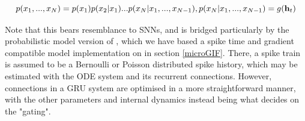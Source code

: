 \documentclass[mphil,deptreport,ianc]{infthesis} %
\begin{document}
\begin{equation}
    p(x_1, ..., x_N) = p(x_1)p(x_2|x_1) ... p(x_N|x_1,...,x_{N-1}), \\
    p(x_N|x_1,...,x_{N-1}) = g(\textbf{h}_t)
\end{equation}

Note that this bears resemblance to SNNs, and is bridged particularly by the probabilistic model version of \cite{Rene2020}, which we have based a spike time and gradient compatible model implementation on in section \ref{microGIF}.
There, a spike train is assumed to be a Bernoulli or Poisson distributed spike history, which may be estimated with the ODE system and its recurrent connections.
However, connections in a GRU \cite{Chung2015a} system are optimised in a more straightforward manner, with the other parameters and internal dynamics instead being what decides on the "gating".
\end{document}
